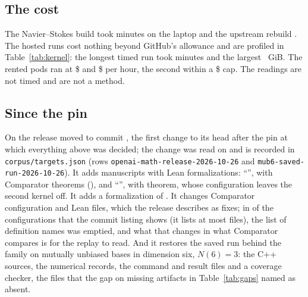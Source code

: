 \documentclass[preprint,11pt,authoryear,a4paper]{elsarticle}
\begin{document}
\subsection{The cost}
The Navier--Stokes build took \MtNsBuildMinutes{} minutes on the laptop and the upstream rebuild \MtNsHeadMinutes. The hosted runs cost nothing beyond GitHub's allowance and are profiled in Table~\ref{tab:kernel}: the longest timed run took \OmMinutesMax{} minutes and the largest \OmRssMaxGiB~GiB. The rented pods ran at \$\OmPodPrice{} and \$\OmPodTwoPrice{} per hour, the second within a \$\OmPodTwoCap{} cap. The readings are not timed and are not a method.

\subsection{Since the pin}\label{sec:since}
On \OmNextDate{} the release moved to commit \OmNextCommit{} \citep{OpenAIMath}, the first change to its head after the pin \MtOaCommit{} at which everything above was decided; the change was read on \OmNextScouted{} and is recorded in \texttt{corpus/targets.json} (rows \texttt{openai-math-release-2026-10-26} and \texttt{mub6-saved-run-2026-10-26}). It adds \OmNextManuscripts{} manuscripts with Lean formalizations: ``\OmNextLocalTitle'', with \OmNextLocalTheorems{} Comparator theorems (\OmNextLocalNames), and ``\OmNextSatTitle'', with \OmNextSatTheorems{} theorem, whose configuration leaves the second kernel off. It adds a formalization of \OmNextHodge. It changes \OmNextFiles{} Comparator configuration and Lean files, which the release describes as fixes; in \OmNextSeenEmptied{} of the \OmNextSeenConfigs{} configurations that the commit listing shows (it lists at most \OmNextSeenCap{} files), the list of definition names was emptied, and what that changes in what Comparator compares is for the replay to read. And it restores the saved run behind the family on mutually unbiased bases in dimension six, $N(6) = 3$: the C++ sources, the numerical records, the command and result files and a coverage checker, the files that the gap on missing artifacts in Table~\ref{tab:gaps} named as absent.
\end{document}
